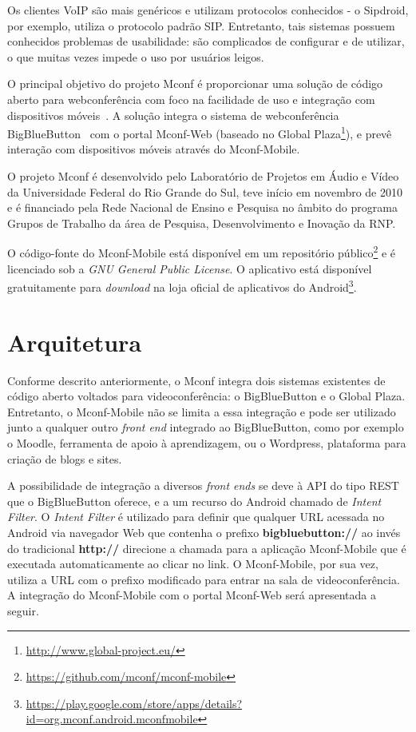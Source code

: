 \documentclass{acm_proc_article-sp}
\begin{document}
Os clientes VoIP são mais genéricos e utilizam protocolos conhecidos - o Sipdroid, por exemplo, utiliza o protocolo padrão SIP. Entretanto, tais sistemas possuem conhecidos problemas de usabilidade: são complicados de configurar e de utilizar, o que muitas vezes impede o uso por usuários leigos.

O principal objetivo do projeto Mconf é proporcionar uma solução de código aberto para webconferência com foco na facilidade de uso e integração com dispositivos móveis~\cite{mconf-book}. A solução integra o sistema de webconferência BigBlueButton~\cite{bigbluebutton} com o portal Mconf-Web (baseado no Global Plaza\footnote{\url{http://www.global-project.eu/}}), e prevê interação com dispositivos móveis através do Mconf-Mobile.

O projeto Mconf é desenvolvido pelo Laboratório de Projetos em Áudio e Vídeo da Universidade Federal do Rio Grande do Sul, teve início em novembro de 2010 e é financiado pela Rede Nacional de Ensino e Pesquisa no âmbito do programa Grupos de Trabalho da área de Pesquisa, Desenvolvimento e Inovação da RNP.

O código-fonte do Mconf-Mobile está disponível em um repositório público\footnote{\url{https://github.com/mconf/mconf-mobile}} e é licenciado sob a \emph{GNU General Public License}. O aplicativo está disponível gratuitamente para \emph{download} na loja oficial de aplicativos do Android\footnote{\url{https://play.google.com/store/apps/details?id=org.mconf.android.mconfmobile}}.


\section{Arquitetura}\label{sec:arquitetura}

Conforme descrito anteriormente, o Mconf integra dois sistemas existentes de código aberto voltados para videoconferência: o BigBlueButton e o Global Plaza. Entretanto, o Mconf-Mobile não se limita a essa integração e pode ser utilizado junto a qualquer outro \emph{front end} integrado ao BigBlueButton, como por exemplo o Moodle, ferramenta de apoio à aprendizagem, ou o Wordpress, plataforma para criação de blogs e sites.

A possibilidade de integração a diversos \emph{front ends} se deve à API do tipo REST que o BigBlueButton oferece, e a um recurso do Android chamado de \emph{Intent Filter}. O \emph{Intent Filter} é utilizado para definir que qualquer URL acessada no Android via navegador Web que contenha o prefixo \textbf{bigbluebutton://} ao invés do tradicional \textbf{http://} direcione a chamada para a aplicação Mconf-Mobile que é executada automaticamente ao clicar no link. O Mconf-Mobile, por sua vez, utiliza a URL com o prefixo modificado para entrar na sala de videoconferência. A integração do Mconf-Mobile com o portal Mconf-Web será apresentada a seguir.
\end{document}
